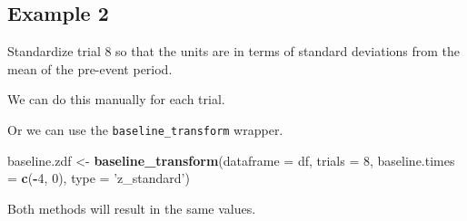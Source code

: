\documentclass[
]{book}
\newenvironment{Shaded}{\begin{snugshade}}{\end{snugshade}}
\newcommand{\CommentTok}[1]{\textcolor[rgb]{0.56,0.35,0.01}{\textit{#1}}}
\newcommand{\DataTypeTok}[1]{\textcolor[rgb]{0.13,0.29,0.53}{#1}}
\newcommand{\DecValTok}[1]{\textcolor[rgb]{0.00,0.00,0.81}{#1}}
\newcommand{\KeywordTok}[1]{\textcolor[rgb]{0.13,0.29,0.53}{\textbf{#1}}}
\newcommand{\NormalTok}[1]{#1}
\newcommand{\OperatorTok}[1]{\textcolor[rgb]{0.81,0.36,0.00}{\textbf{#1}}}
\newcommand{\StringTok}[1]{\textcolor[rgb]{0.31,0.60,0.02}{#1}}
\begin{document}
\hypertarget{stand-examples-ex2}{%
\subsection{Example 2}\label{stand-examples-ex2}}

Standardize trial 8 so that the units are in terms of standard deviations from the mean of the pre-event period.

We can do this manually for each trial.

\begin{Shaded}
\end{Shaded}

Or we can use the \texttt{baseline\_transform} wrapper.

\begin{Shaded}
\begin{Highlighting}[]
\NormalTok{baseline.zdf <-}\StringTok{ }\KeywordTok{baseline_transform}\NormalTok{(}\DataTypeTok{dataframe =}\NormalTok{ df,}
                                   \DataTypeTok{trials =} \DecValTok{8}\NormalTok{,}
                                   \DataTypeTok{baseline.times =} \KeywordTok{c}\NormalTok{(}\OperatorTok{-}\DecValTok{4}\NormalTok{, }\DecValTok{0}\NormalTok{),}
                                   \DataTypeTok{type =} \StringTok{'z_standard'}\NormalTok{)}
\end{Highlighting}
\end{Shaded}

Both methods will result in the same values.

\begin{Shaded}
\end{Shaded}
\end{document}
